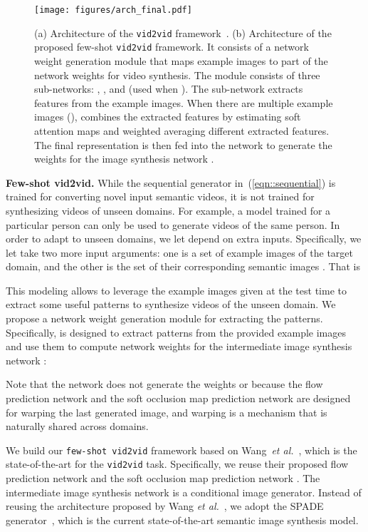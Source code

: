 \documentclass{article}
\newcommand{\vidtovid}{{\texttt{vid2vid}}\xspace}
\newcommand{\fewshotvidtovid}{{\texttt{few-shot vid2vid}}\xspace}
\newcommand{\etal}{\textit{et al.}}
\begin{document}
\begin{figure}
\vspace{-2mm}
\centering
\texttt{[image: figures/arch\_final.pdf]}
\caption{(a) Architecture of the \vidtovid framework~\cite{wang2018video}. (b) Architecture of the proposed few-shot \vidtovid framework. It consists of a network weight generation module  that maps example images to part of the network weights for video synthesis. The module  consists of three sub-networks: , , and  (used when ). 
The sub-network  extracts features  from the example images. When there are multiple example images (),  combines the extracted features by estimating soft attention maps  and weighted averaging different extracted features.
The final representation is then fed into the network  to generate the weights  for the image synthesis network .
}\label{fig::arch}
\vspace{-3mm}
\end{figure} 
{\bf Few-shot vid2vid.} While the sequential generator in~(\ref{eqn::sequential}) is trained for converting novel input semantic videos, it is not trained for synthesizing videos of unseen domains. For example, a model trained for a particular person can only be used to generate videos of the same person. In order to adapt  to unseen domains, we let  depend on extra inputs. Specifically, we let  take two more input arguments: one is a set of  example images  of the target domain, and the other is the set of their corresponding semantic images . That is


This modeling allows  to leverage the example images given at the test time to extract some useful patterns to synthesize videos of the unseen domain. We propose a network weight generation module  for extracting the patterns. Specifically,  is designed to extract patterns from the provided example images and use them to compute network weights  for the intermediate image synthesis network : 

Note that the network  does not generate the weights  or  because the flow prediction network  and the soft occlusion map prediction network  are designed for warping the last generated image, and warping is a mechanism that is naturally shared across domains.

We build our \fewshotvidtovid framework based on Wang~\etal~\cite{wang2018video}, which is the state-of-the-art for the \vidtovid task. Specifically, we reuse their proposed flow prediction network  and the soft occlusion map prediction network . The intermediate image synthesis network  is a conditional image generator. Instead of reusing the architecture proposed by Wang \etal~\cite{wang2018video}, we adopt the SPADE generator~\cite{park2019SPADE}, which is the current state-of-the-art semantic image synthesis model. 
\end{document}
